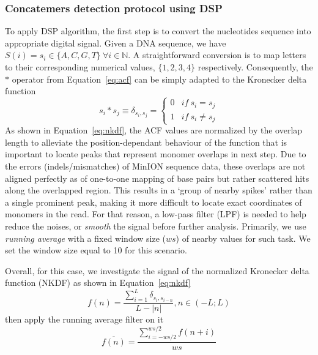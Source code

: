 \subsubsection{Concatemers detection protocol using DSP}
To apply DSP algorithm, the first step is to convert the nucleotides sequence into appropriate digital signal.
Given a DNA sequence, we have $S(i)=s_i \in \{A,C,G,T\} \: \forall i \in \mathbb{N}$. A straightforward conversion is to map letters to their corresponding numerical values, \EG{} $\{1,2,3,4\}$ respectively.
Consequently, the $\ast$ operator from Equation~\ref{eq:acf} can be simply adapted to the Kronecker delta function
\[
s_i \ast s_j \equiv \delta_{s_i,s_j} = \left\{
\begin{array}{ll}
0     &  if \: s_i = s_j\\
1     &  if \: s_i \neq s_j
\end{array}
\right.
\]
As shown in Equation~\ref{eq:nkdf}, the ACF values are normalized by the overlap length to alleviate the position-dependant behaviour of the function that is important to locate peaks that represent monomer overlaps in next step. 
Due to the errors (indels/mismatches) of MinION sequence data, these overlaps are not aligned perfectly as of one-to-one mapping of base pairs but rather scattered hits along the overlapped region.
This results in a `group of nearby spikes' rather than a single prominent peak, making it more difficult to locate exact coordinates of monomers in the read. 
For that reason, a low-pass filter (LPF) is needed to help reduce the noises, or \emph{smooth} the signal before further analysis. 
Primarily, we use \emph{running average} with a fixed window size ($ws$) of nearby values for such task. 
We set the window size equal to 10 for this scenario. 

Overall, for this case, we investigate the signal of the normalized Kronecker delta function (NKDF) as shown in Equation~\ref{eq:nkdf}
\begin{equation}
\label{eq:nkdf}
f(n) = \frac{\displaystyle \sum_{i=1}^{L}{\delta_{s_i,s_{i-n}}}}
            {\displaystyle L-|n|}
            , n \in (-L;L)
\end{equation}
then apply the running average filter on it
\[
\overline{f(n)} = \frac{\displaystyle \sum_{i=-ws/2}^{ws/2}{f(n+i)}}
            {\displaystyle ws}
\]

